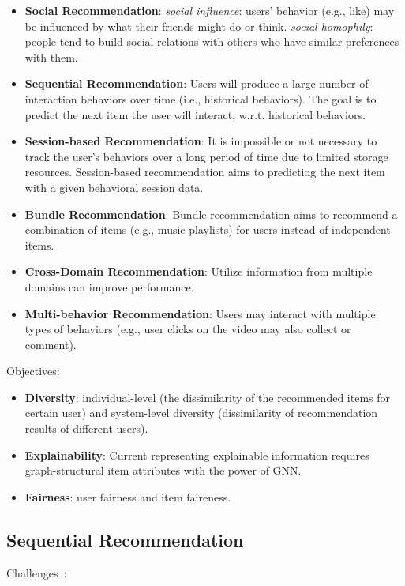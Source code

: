 \begin{itemize}
	\item \textbf{Social Recommendation}: \emph{social influence}: users’ behavior (e.g., like) may be influenced by what their friends might do or think. \emph{social homophily}: people tend to build social relations with others who have similar preferences with them.
	\item \textbf{Sequential Recommendation}: Users will produce a large number of interaction behaviors over time (i.e., historical behaviors). The goal is to predict the next item the user will interact, w.r.t. historical behaviors.
	\item \textbf{Session-based Recommendation}: It is impossible or not necessary to track the user’s behaviors over a long period of time due to limited storage resources. Session-based recommendation aims to predicting the next item with a given behavioral session data.
	\item \textbf{Bundle Recommendation}: Bundle recommendation aims to recommend a combination of items (e.g., music playlists) for users instead of independent items.
	\item \textbf{Cross-Domain Recommendation}: Utilize information from multiple domains can improve performance.
	\item \textbf{Multi-behavior Recommendation}: Users may interact with multiple types of behaviors (e.g., user clicks on the video may also collect or comment).
\end{itemize}

Objectives:

\begin{itemize}
	\item \textbf{Diversity}: individual-level (the dissimilarity of the recommended items for certain user) and system-level diversity (dissimilarity of recommendation results of different users).
	\item \textbf{Explainability}: Current representing explainable information requires graph-structural item attributes with the power of GNN.
	\item \textbf{Fairness}: user fairness and item faireness.
\end{itemize}

\subsection{Sequential Recommendation}

Challenges~:

